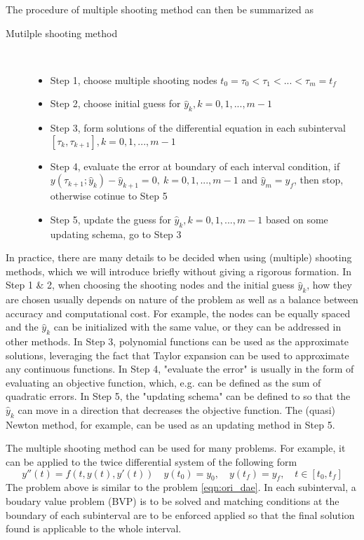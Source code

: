 The procedure of multiple shooting method can then be summarized as
\begin{description}
	\item[Mutilple shooting method] \
	\begin{itemize}
		\item Step 1, choose multiple shooting nodes $t_0 = \tau_0 < \tau_1 < ... < \tau_m = t_f$ 
		\item Step 2, choose initial guess for $\hat{y}_k, k = 0, 1, ..., m-1$ 
		\item Step 3, form solutions of the differential equation in each subinterval $[\tau_k, \tau_{k+1}], k = 0, 1, ..., m-1$
		\item Step 4, evaluate the error at boundary of each interval condition, if $y(\tau_{k+1}; \hat{y}_k) - \hat{y}_{k+1} = 0, \  k = 0, 1, ..., m-1$ and $\hat{y}_{m} = y_f$, then stop, otherwise cotinue to Step 5
		\item Step 5, update the guess for $\hat{y}_k, k = 0, 1, ..., m-1$ based on some updating schema, go to Step 3
	\end{itemize}
\end{description}

In practice, there are many details to be decided when using (multiple) shooting methods, which we will introduce briefly without giving a rigorous formation. In Step 1 \& 2, when choosing the shooting nodes and the initial guess $\hat{y}_k$, how they are chosen usually depends on nature of the problem as well as a balance between accuracy and computational cost. For example, the nodes can be equally spaced and the $\hat{y}_k$ can be initialized with the same value, or they can be addressed in other methods. In Step 3, polynomial functions can be used as the approximate solutions, leveraging the fact that Taylor expansion can be used to approximate any continuous functions. In Step 4, "evaluate the error" is usually in the form of evaluating an objective function, which, e.g. can be defined as the sum of quadratic errors. In Step 5, the "updating schema" can be defined to so that the $\hat{y}_k$ can move in a direction that decreases the objective function. The (quasi) Newton method, for example, can be used as an updating method in Step 5. 


The multiple shooting method can be used for many problems. For example, it can be applied to the twice differential system of the following form 
\begin{equation*}
	 y''(t) = f(t, y(t), y'(t))  \quad y(t_0) = y_0, \quad y(t_f) = y_f,  \quad t \in [t_0, t_f]
	 \label{eqn:tdode}
\end{equation*}
The problem above is similar to the problem \ref{eqn:ori_dae}. In each subinterval, a boudary value problem (BVP) is to be solved and matching conditions at the boundary of each subinterval  are to be enforced applied so that the final solution found is applicable to the whole interval. 


